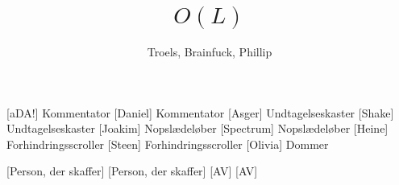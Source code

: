 \documentclass[a4paper,11pt]{article}
\title{$O(L)$}
\author{Troels, Brainfuck, Phillip}
\begin{document}
\maketitle

\begin{roles}
  [aDA!] Kommentator
  [Daniel] Kommentator
  [Asger] Undtagelseskaster
  [Shake] Undtagelseskaster
  [Joakim] Nopslædeløber
  [Spectrum] Nopslædeløber
  [Heine] Forhindringsscroller
  [Steen] Forhindringsscroller
  [Olivia] Dommer
\end{roles}

\begin{props}
  [Person, der skaffer]
  [Person, der skaffer]
  [AV]
  [AV]
\end{props}
\end{document}

